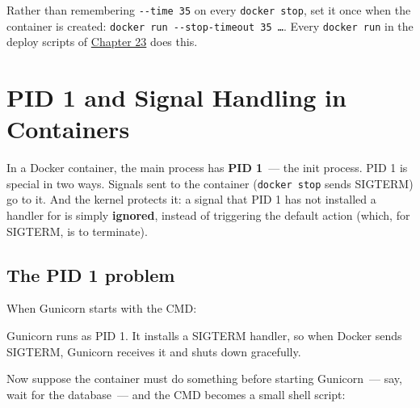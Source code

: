 \noindent{}Rather than remembering \texttt{-\/-time\ 35} on every \texttt{docker\ stop}, set it once when the container is created: \texttt{docker\ run\ -}\allowbreak{}\texttt{-}\allowbreak{}\texttt{stop-}\allowbreak{}\texttt{timeout\ 35\ …}. Every \texttt{docker\ run} in the deploy scripts of \hyperref[ch:23-code-transfer]{Chapter 23} does this.

\setcounter{section}{4}
\section{PID 1 and Signal Handling in Containers}\label{24-process-startup:245-pid-1-and-signal-handling-in-containers}

In a Docker container, the main process has \textbf{PID 1}~--- the init process. PID 1 is special in two ways. Signals sent to the container (\texttt{docker\ stop} sends SIGTERM) go to it. And the kernel protects it: a signal that PID 1 has not installed a handler for is simply \textbf{ignored}, instead of triggering the default action (which, for SIGTERM, is to terminate).

\subsection*{The PID 1 problem}\label{24-process-startup:the-pid-1-problem}

When Gunicorn starts with the CMD:

\begin{codebox}[short]

\begin{Shaded}
\begin{Highlighting}[]
\NormalTok{ [}\NormalTok{, }\NormalTok{, }\NormalTok{, }\NormalTok{]}
\end{Highlighting}
\end{Shaded}

\end{codebox}

\noindent{}Gunicorn runs as PID 1. It installs a SIGTERM handler, so when Docker sends SIGTERM, Gunicorn receives it and shuts down gracefully.

Now suppose the container must do something before starting Gunicorn~--- say, wait for the database~--- and the CMD becomes a small shell script:

\begin{codebox}[short]

\begin{Shaded}
\begin{Highlighting}[]
\NormalTok{ [}\NormalTok{, }\NormalTok{, }\NormalTok{]}
\end{Highlighting}
\end{Shaded}

\end{codebox}

